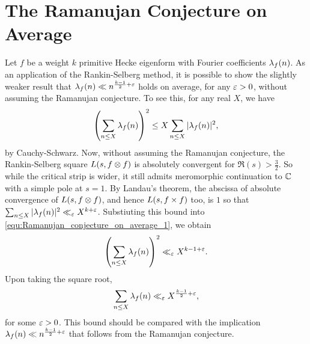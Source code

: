 \documentclass[12pt,oneside]{book}
\begin{document}
   \section{The Ramanujan Conjecture on Average}
      Let $f$ be a weight $k$ primitive Hecke eigenform with Fourier coefficients $\lambda_{f}(n)$. As an application of the Rankin-Selberg method, it is possible to show the slightly weaker result that $\lambda_{f}(n) \ll n^{\frac{k-1}{2}+\varepsilon}$ holds on average, for any $\varepsilon > 0$, without assuming the Ramanujan conjecture. To see this, for any real $X$, we have
      \begin{equation}\label{equ:Ramanujan_conjecture_on_average_1}
        \left(\sum_{n \le X}\lambda_{f}(n)\right)^{2} \le X\sum_{n \le X}|\lambda_{f}(n)|^{2},
      \end{equation}
      by Cauchy-Schwarz. Now, without assuming the Ramanujan conjecture, the Rankin-Selberg square $L(s,f \otimes f)$ is absolutely convergent for $\Re(s) > \frac{3}{2}$. So while the critical strip is wider, it still admits meromorphic continuation to $\mathbb{C}$ with a simple pole at $s = 1$. By Landau's theorem, the abscissa of absolute convergence of $L(s,f \otimes f)$, and hence $L(s,f \times f)$ too, is $1$ so that $\sum_{n \le X}|\lambda_{f}(n)|^{2} \ll_{\varepsilon} X^{k+\varepsilon}$. Substiuting this bound into \cref{equ:Ramanujan_conjecture_on_average_1}, we obtain
      \[
        \left(\sum_{n \le X}\lambda_{f}(n)\right)^{2} \ll_{\varepsilon} X^{k-1+\varepsilon}.
      \]
      Upon taking the square root,
      \[
        \sum_{n \le X}\lambda_{f}(n) \ll_{\varepsilon} X^{\frac{k-1}{2}+\varepsilon},
      \]
      for some $\varepsilon > 0$. This bound should be compared with the implication $\lambda_{f}(n) \ll n^{\frac{k-1}{2}+\varepsilon}$ that follows from the Ramanujan conjecture.
\end{document}

